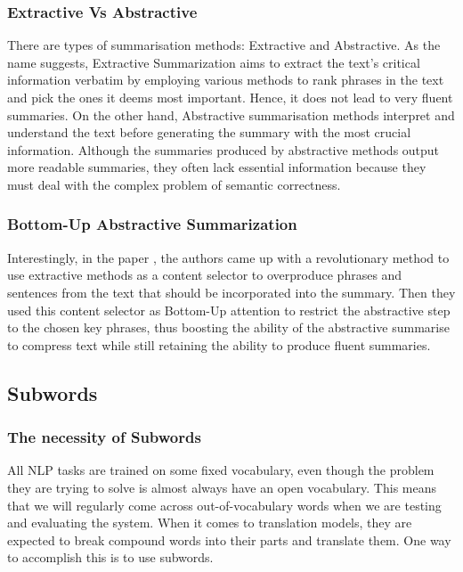 \documentclass[12pt,a4paper,twoside,openright]{report}
\begin{document}
\subsubsection{Extractive Vs Abstractive}
 There are types of summarisation methods: Extractive and Abstractive. As the name suggests, Extractive Summarization aims to extract the text's critical information verbatim by employing various methods to rank phrases in the text and pick the ones it deems most important. Hence, it does not lead to very fluent summaries. On the other hand, Abstractive summarisation methods interpret and understand the text before generating the summary with the most crucial information. Although the summaries produced by abstractive methods output more readable summaries, they often lack essential information because they must deal with the complex problem of semantic correctness. 

\subsubsection{Bottom-Up Abstractive Summarization}
Interestingly, in the paper \cite{summary}, the authors came up with a revolutionary method to use extractive methods as a content selector to overproduce phrases and sentences from the text that should be incorporated into the summary. Then they used this content selector as Bottom-Up attention to restrict the abstractive step to the chosen key phrases, thus boosting the ability of the abstractive summarise to compress text while still retaining the ability to produce fluent summaries.

\subsection{Subwords}
\label{subwords}

\subsubsection{The necessity of Subwords}
All NLP tasks are trained on some fixed vocabulary, even though the problem they are trying to solve is almost always have an open vocabulary. This means that we will regularly come across out-of-vocabulary words when we are testing and evaluating the system. When it comes to translation models, they are expected to break compound words into their parts and translate them. One way to accomplish this is to use subwords. 
\end{document}
